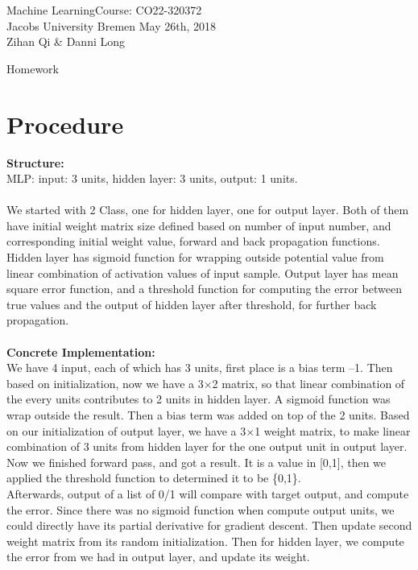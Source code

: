 \documentclass[a4paper]{article}
\newcommand{\coursename}{Machine Learning}
\newcommand{\courseno}{CO22-320372}
\newcommand{\sheettitle}{Homework}
\newcommand{\mytoday}{{May 26th}, 2018}
\newcounter{assignmentno}
\newcommand{\assignment}{\arabic{assignmentno}}
\begin{document}
\coursename \hfill Course: \courseno\\
Jacobs University Bremen \hfill \mytoday\\
{Zihan Qi \& Danni Long}\hfill
\vspace*{0.3cm}\\
\begin{center}
{\Large \sheettitle{} {\assignment}\\}
\end{center}

\section*{Procedure}
\textbf{Structure:}\\
MLP:
input: 3 units, hidden layer: 3 units, output: 1 units.\\\\
We started with 2 Class, one for hidden layer, one for output layer. Both of them have initial weight matrix size defined based on number of input number, and corresponding initial weight value, forward and back propagation functions. Hidden layer has sigmoid function for wrapping outside potential value from linear combination of activation values of input sample. Output layer has mean square error function, and a threshold function for computing the error between true values and the output of hidden layer after threshold, for further back propagation.\\\\
\textbf{Concrete Implementation:}\\
We have 4 input, each of which has 3 units, first place is a bias term --1. Then based on initialization, now we have a 3$\times$2 matrix, so that linear combination of the every units contributes to 2 units in hidden layer. A sigmoid function was wrap outside the result. Then a bias term was added on top of the 2 units. Based on our initialization of output layer, we have a 3$\times$1 weight matrix, to make linear combination of 3 units from hidden layer for the one output unit in output layer.\\
Now we finished forward pass, and got a result. It is a value in [0,1], then we applied the threshold function to determined it to be \{0,1\}.\\
Afterwards, output of a list of 0/1 will compare with target output, and compute the error. Since there was no sigmoid function when compute output units, we could directly have its partial derivative for gradient descent. Then update second weight matrix from its random initialization. Then for hidden layer, we compute the error from we had in output layer, and update its weight.\\
\end{document}
